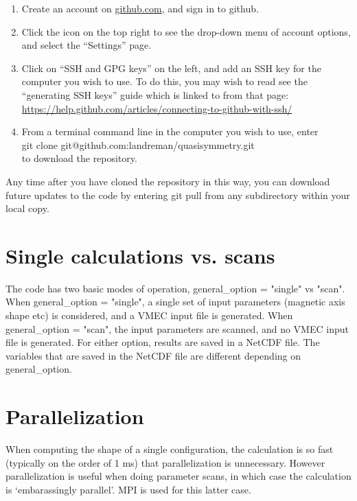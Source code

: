 \begin{enumerate}
\item Create an account on \url{github.com}, and sign in to {\ttfamily github}.
\item Click the icon on the top right to see the drop-down menu of account options, and select the ``Settings'' page.
\item Click on ``SSH and GPG keys'' on the left, and add an SSH key for the computer you wish to use. To do this, you may wish to read see the ``generating SSH keys'' guide which is linked to from that page: \url{https://help.github.com/articles/connecting-to-github-with-ssh/}
\item From a terminal command line in the computer you wish to use, enter\\
{\ttfamily git clone git@github.com:landreman/quasisymmetry.git}\\
 to download the repository.
\end{enumerate}

Any time after you have cloned the repository in this way, you can download future updates to the code by entering {\ttfamily git pull} from any subdirectory within your local copy.



\section{Single calculations vs. scans}

The code has two basic modes of operation, {\ttfamily general\_option = "single"} vs {\ttfamily "scan"}. 
When {\ttfamily general\_option = "single"}, a single set of input parameters (magnetic axis shape etc) is
considered, and a VMEC input file is generated. When {\ttfamily general\_option = "scan"},
the input parameters are scanned, and no VMEC input file is generated. For either option, results
are saved in a NetCDF file. The variables that are saved in the NetCDF file are different depending on
{\ttfamily general\_option}.

\section{Parallelization}

When computing the shape of a single configuration, the calculation is so fast (typically on the order of 1 ms)
that parallelization is unnecessary. However parallelization is useful when doing parameter scans,
in which case the calculation is `embarassingly parallel'. MPI is used for this latter case.


